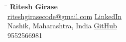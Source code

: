 \documentclass[a4paper,10pt]{article}
\begin{document}
\begin{tabbing}
\hspace{4in} \= \kill
{\Huge \textbf{Ritesh Girase}} \\
\href{mailto:riteshgirasecode@gmail.com}{riteshgirasecode@gmail.com} \> 
\hspace{1.8in}
\href{https://www.linkedin.com/}{LinkedIn} \\
Nashik, Maharashtra, India \> \hspace{1.85in}\href{https://github.com}{GitHub} \\ 
9552566981 \\
\end{tabbing}
\vspace{-0.4cm}
\end{document}
